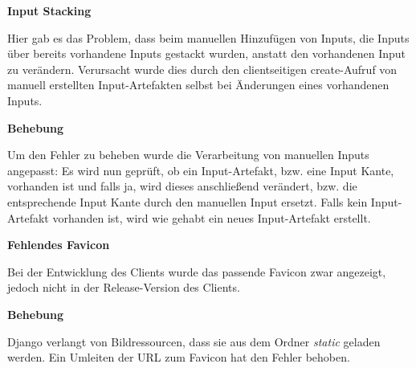 \vspace{2em}



\textbf{\large Input Stacking}
\newline


Hier gab es das Problem, dass beim manuellen Hinzufügen von Inputs, die Inputs über bereits vorhandene Inputs \glqq gestackt\grqq{} wurden, anstatt den vorhandenen Input zu verändern. Verursacht wurde dies durch den clientseitigen \glqq create\grqq -Aufruf von manuell erstellten Input-Artefakten selbst bei Änderungen eines vorhandenen Inputs. 
\newline


\textbf{Behebung}
\newline

Um den Fehler zu beheben wurde die Verarbeitung von manuellen Inputs angepasst: Es wird nun geprüft, ob ein Input-Artefakt, bzw. eine Input Kante, vorhanden ist und falls ja, wird dieses anschließend verändert, bzw. die entsprechende Input Kante durch den manuellen Input ersetzt. Falls kein Input-Artefakt vorhanden ist, wird wie gehabt ein neues Input-Artefakt erstellt.
\newline


\vspace{2em}



\textbf{\large Fehlendes Favicon}
\newline


Bei der Entwicklung des Clients wurde das passende Favicon zwar angezeigt, jedoch nicht in der Release-Version des Clients.
\newline

\textbf{Behebung}
\newline


Django verlangt von Bildressourcen, dass sie aus dem Ordner \textit{static} geladen werden. Ein Umleiten der URL zum Favicon hat den Fehler behoben.
\newline

\vspace{2em}


\newpage


